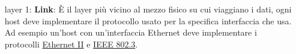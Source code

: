 \begin{enumerate}

        
    \item[layer 1:] \textbf{Link}: È il layer più vicino al mezzo fisico su cui viaggiano i dati, ogni host deve implementare il protocollo usato per la specifica interfaccia che usa. Ad esempio un'host con un'interfaccia Ethernet deve implementare i protocolli \href{https://en.wikipedia.org/wiki/Ethernet_frame#Ethernet_II}{Ethernet II} e \href{https://en.wikipedia.org/wiki/IEEE_802.3}{IEEE 802.3}.

\end{enumerate}

